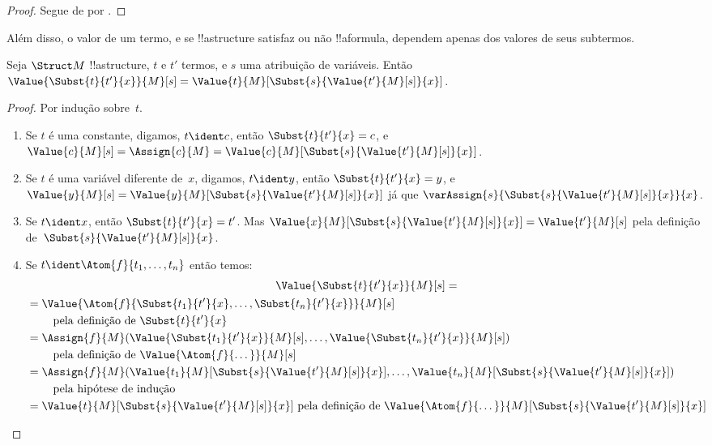 \documentclass[../../../include/open-logic-section]{subfiles}
\begin{document}
\begin{proof}
Segue de  por .
\end{proof}

Além disso, o valor de um termo, e se !!a{structure}
satisfaz ou não !!a{formula}, dependem apenas dos valores de seus subtermos.

\begin{prop}
Seja $\Struct M$ !!a{structure}, $t$ e $t'$ termos, e $s$ uma
atribuição de variáveis. Então $\Value{\Subst{t}{t'}{x}}{M}[s] =
\Value{t}{M}[\Subst{s}{\Value{t'}{M}[s]}{x}]$.
\end{prop}

\begin{proof}
Por indução sobre~$t$.
\begin{enumerate}
\item Se $t$ é uma constante, digamos, $t\ident c$, então $\Subst{t}{t'}{x} =
  c$, e $\Value{c}{M}[s] = \Assign{c}{M} =
  \Value{c}{M}[\Subst{s}{\Value{t'}{M}[s]}{x}]$.

\item Se $t$ é uma variável diferente de~$x$, digamos, $t \ident y$, então
  $\Subst{t}{t'}{x} = y$, e $\Value{y}{M}[s] =
  \Value{y}{M}[\Subst{s}{\Value{t'}{M}[s]}{x}]$ já que
  $\varAssign{s}{\Subst{s}{\Value{t'}{M}[s]}{x}}{x}$.

\item Se $t \ident x$, então $\Subst{t}{t'}{x} = t'$. Mas
  $\Value{x}{M}[\Subst{s}{\Value{t'}{M}[s]}{x}] = \Value{t'}{M}[s]$ pela
  definição de~$\Subst{s}{\Value{t'}{M}[s]}{x}$.

\item Se $t \ident \Atom{f}{t_1,\dots,t_n}$ então temos:
\begin{multline*}
  \Value{\Subst{t}{t'}{x}}{M}[s]  = \\
  \begin{aligned}[b]
& = \Value{\Atom{f}{\Subst{t_1}{t'}{x}, \dots, \Subst{t_n}{t'}{x}}}{M}[s]\\
& \qquad    \text{ pela definição de $\Subst{t}{t'}{x}$}\\
& = \Assign{f}{M}(\Value{\Subst{t_1}{t'}{x}}{M}[s], \dots,
    \Value{\Subst{t_n}{t'}{x}}{M}[s])\\
    & \qquad  \text{ pela definição de $\Value{\Atom{f}{\dots}}{M}[s]$}\\
& = \Assign{f}{M}(\Value{t_1}{M}[\Subst{s}{\Value{t'}{M}[s]}{x}], \dots,
   \Value{t_n}{M}[\Subst{s}{\Value{t'}{M}[s]}{x}])\\
& \qquad    \text{ pela hipótese de indução}\\
& = \Value{t}{M}[\Subst{s}{\Value{t'}{M}[s]}{x}]
    \text{ pela definição de $\Value{\Atom{f}{\dots}}{M}[\Subst{s}{\Value{t'}{M}[s]}{x}]$}
  \end{aligned}
\end{multline*}
\end{enumerate}
\end{proof}
\end{document}
